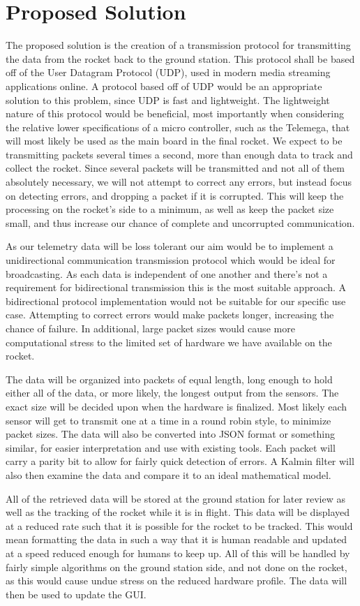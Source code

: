 \documentclass[onecolumn, draftclsnofoot,10pt, compsoc]{IEEEtran}
\begin{document}
\section{Proposed Solution}
The proposed solution is the creation of a transmission protocol for transmitting the data from the rocket back to the ground station. This protocol shall be based off of the User Datagram Protocol (UDP), used in modern media streaming applications online. A protocol based off of UDP would be an appropriate solution to this problem, since UDP is fast and lightweight. The lightweight nature of this protocol would be beneficial, most importantly when considering the relative lower specifications of a micro controller, such as the Telemega, that will most likely be used as the main board in the final rocket. We expect to be transmitting packets several times a second, more than enough data to track and collect the rocket. Since several packets will be transmitted and not all of them absolutely necessary, we will not attempt to correct any errors, but instead focus on detecting errors, and dropping a packet if it is corrupted. This will keep the processing on the rocket’s side to a minimum, as well as keep the packet size small, and thus increase our chance of complete and uncorrupted communication.  \par
As our telemetry data will be loss tolerant our aim would be to implement a unidirectional communication transmission protocol which would be ideal for broadcasting. As each data is independent of one another and there's not a requirement for bidirectional transmission this is the most suitable approach. A bidirectional protocol implementation would not be suitable for our specific use case.  Attempting to correct errors would make packets longer, increasing the chance of failure. In additional, large packet sizes would cause more computational stress to the limited set of hardware we have available on the rocket.
\par The data will be organized into packets of equal length, long enough to hold either all of the data, or more likely, the longest output from the sensors. The exact size will be decided upon when the hardware is finalized. Most likely each sensor will get to transmit one at a time in a round robin style, to minimize packet sizes. The data will also be converted into JSON format or something similar, for easier interpretation and use with existing tools. Each packet will carry a parity bit to allow for fairly quick detection of errors. A Kalmin filter will also then examine the data and compare it to an ideal mathematical model. \par 
All of the retrieved data will be stored at the ground station for later review as well as the tracking of the rocket while it is in flight. This data will be displayed at a reduced rate such that it is possible for the rocket to be tracked. This would mean formatting the data in such a way that it is human readable and updated at a speed reduced enough for humans to keep up. All of this will be handled by fairly simple algorithms on the ground station side, and not done on the rocket, as this would cause undue stress on the reduced hardware profile. The data will then be used to update the GUI. \par
\end{document}
